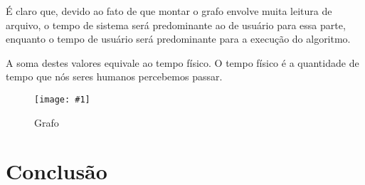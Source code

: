\documentclass[12pt]{article}
\def\widthmod{}
\newcommand*\image[2]{\noindent \begin{figure}[htbp]
    \centering
    \texttt{[image: \#1]}
    \caption{#2}
    \label{fig: #1}
    \end{figure}
    }
\begin{document}
    É claro que, devido ao fato de que montar o grafo envolve muita leitura de
    arquivo, o tempo de sistema será predominante ao de usuário para essa parte,
    enquanto o tempo de usuário será predominante para a execução do algoritmo.

    A soma destes valores equivale ao tempo físico. O tempo físico é a
    quantidade de tempo que nós seres humanos percebemos passar. 


    \image{iotimes}{Grafo}

    \section{Conclusão}

    \printbibliography[title={Whole bibliography}]
\end{document}
